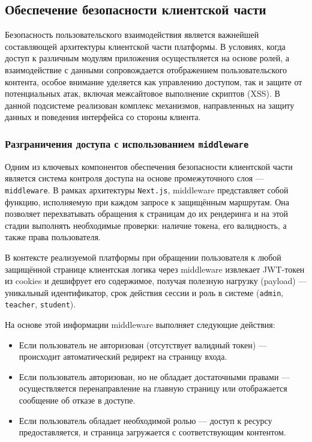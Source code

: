 \subsection{Обеспечение безопасности клиентской части}

Безопасность пользовательского взаимодействия является важнейшей составляющей архитектуры клиентской части платформы. В условиях, когда доступ к различным модулям приложения осуществляется на основе ролей, а взаимодействие с данными сопровождается отображением пользовательского контента, особое внимание уделяется как управлению доступом, так и защите от потенциальных атак, включая межсайтовое выполнение скриптов (XSS). В данной подсистеме реализован комплекс механизмов, направленных на защиту данных и поведения интерфейса со стороны клиента.

\subsubsection{Разграничения доступа с использованием \texttt{middleware}}
Одним из ключевых компонентов обеспечения безопасности клиентской части является система контроля доступа на основе промежуточного слоя — \texttt{middleware}. В рамках архитектуры \texttt{Next.js}, middleware представляет собой функцию, исполняемую при каждом запросе к защищённым маршрутам. Она позволяет перехватывать обращения к страницам до их рендеринга и на этой стадии выполнять необходимые проверки: наличие токена, его валидность, а также права пользователя.

В контексте реализуемой платформы при обращении пользователя к любой защищённой странице клиентская логика через middleware извлекает JWT-токен из cookies и дешифрует его содержимое, получая полезную нагрузку (payload) — уникальный идентификатор, срок действия сессии и роль в системе (\texttt{admin}, \texttt{teacher}, \texttt{student}).

На основе этой информации middleware выполняет следующие действия:
\begin{itemize}
  \item Если пользователь не авторизован (отсутствует валидный токен) — происходит автоматический редирект на страницу входа.
  \item Если пользователь авторизован, но не обладает достаточными правами — осуществляется перенаправление на главную страницу или отображается сообщение об отказе в доступе.
  \item Если пользователь обладает необходимой ролью — доступ к ресурсу предоставляется, и страница загружается с соответствующим контентом.
\end{itemize}

